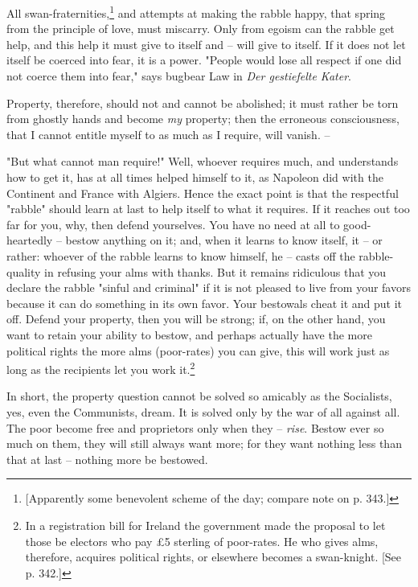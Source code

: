 \documentclass[a4paper]{book}
\begin{document}
All swan-fraternities,\footnote{[Apparently some benevolent scheme of the day; 
compare note on p. 343.]} and attempts at making the rabble happy, that spring 
from the principle of love, must miscarry. Only from egoism can the rabble get 
help, and this help it must give to itself and -- will give to itself. If it 
does not let itself be coerced into fear, it is a power. "{}People would lose 
all respect if one did not coerce them into fear,"{} says bugbear Law in 
\textit{Der gestiefelte Kater}.

Property, therefore, should not and cannot be abolished; it must rather be 
torn from ghostly hands and become \textit{my} property; then the erroneous 
consciousness, that I cannot entitle myself to as much as I require, will 
vanish. --

"{}But what cannot man require!"{} Well, whoever requires much, and 
understands how to get it, has at all times helped himself to it, as Napoleon 
did with the Continent and France with Algiers. Hence the exact point is that 
the respectful "{}rabble"{} should learn at last to help itself to what it 
requires. If it reaches out too far for you, why, then defend yourselves. You 
have no need at all to good-heartedly -- bestow anything on it; and, when it 
learns to know itself, it -- or rather: whoever of the rabble learns to know 
himself, he -- casts off the rabble-quality in refusing your alms with thanks. 
But it remains ridiculous that you declare the rabble "{}sinful and 
criminal"{} if it is not pleased to live from your favors because it can do 
something in its own favor. Your bestowals cheat it and put it off. Defend 
your property, then you will be strong; if, on the other hand, you want to 
retain your ability to bestow, and perhaps actually have the more political 
rights the more alms (poor-rates) you can give, this will work just as long as 
the recipients let you work it.\footnote{In a registration bill for Ireland 
the government made the proposal to let those be electors who pay \pounds{}5 
sterling of poor-rates. He who gives alms, therefore, acquires political 
rights, or elsewhere becomes a swan-knight. [See p. 342.]}

In short, the property question cannot be solved so amicably as the 
Socialists, yes, even the Communists, dream. It is solved only by the war of 
all against all. The poor become free and proprietors only when they -- 
\textit{rise}. Bestow ever so much on them, they will still always want more; 
for they want nothing less than that at last -- nothing more be bestowed.
\end{document}
